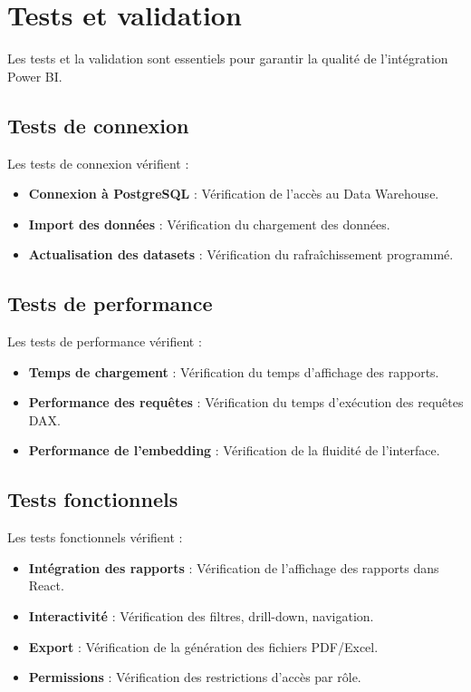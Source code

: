 \section{Tests et validation}
\label{sec:sprint7-tests}

Les tests et la validation sont essentiels pour garantir la qualité de l'intégration Power BI.

\subsection{Tests de connexion}

Les tests de connexion vérifient :

\begin{itemize}
    \item \textbf{Connexion à PostgreSQL} : Vérification de l'accès au Data Warehouse.
    \item \textbf{Import des données} : Vérification du chargement des données.
    \item \textbf{Actualisation des datasets} : Vérification du rafraîchissement programmé.
\end{itemize}

\subsection{Tests de performance}

Les tests de performance vérifient :

\begin{itemize}
    \item \textbf{Temps de chargement} : Vérification du temps d'affichage des rapports.
    \item \textbf{Performance des requêtes} : Vérification du temps d'exécution des requêtes DAX.
    \item \textbf{Performance de l'embedding} : Vérification de la fluidité de l'interface.
\end{itemize}

\subsection{Tests fonctionnels}

Les tests fonctionnels vérifient :

\begin{itemize}
    \item \textbf{Intégration des rapports} : Vérification de l'affichage des rapports dans React.
    \item \textbf{Interactivité} : Vérification des filtres, drill-down, navigation.
    \item \textbf{Export} : Vérification de la génération des fichiers PDF/Excel.
    \item \textbf{Permissions} : Vérification des restrictions d'accès par rôle.
\end{itemize}

